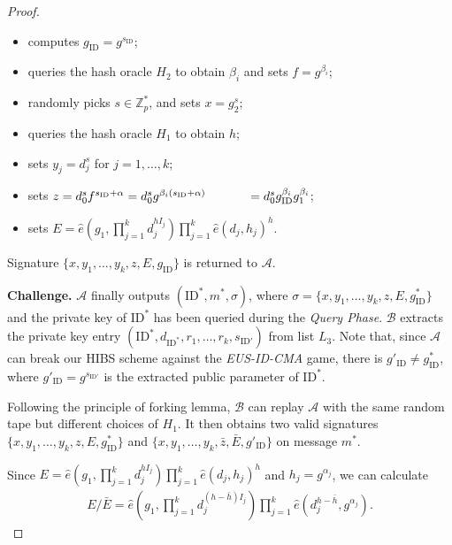 \documentclass[times]{secauth}
\theoremstyle{definition}
\theoremstyle{remark}
\begin{document}
\begin{proof}
\begin{itemize}
	\begin{itemize}
		\item computes $g_\mathrm{ID} = g^{s_\mathrm{ID}}$;
		\item queries the hash oracle $H_2$ to obtain $\beta_i$ and sets $f = g^{\beta_i}$;
		\item randomly picks $s \in \mathbb{Z}_p^*$, and sets $x = g_2^s$;
		\item queries the hash oracle $H_1$ to obtain $h$;
		\item sets $y_j = d_j^s$ for $j = 1,\ldots, k$;
		\item sets $z= d_0^{s} f^{s_\mathrm{ID}+\alpha} = d_0^{s}g^{\beta_i(s_\mathrm{ID}+\alpha)} \\
		~~~~~~~~~~= d_0^{s}g_\mathrm{ID}^{\beta_i}g_1^{\beta_i}$;
		\item sets $E= \hat{e}(g_1, \prod_{j=1}^{k} d_j^{hI_j})\prod_{j=1}^{k} \hat{e}(d_j, h_j)^h$.	
	\end{itemize}
	Signature $\{x, y_1, \ldots, y_k, z, E, g_{\mathrm{ID}}\}$ is returned to $\mathcal{A}$.
\end{itemize}
\textbf{Challenge.} 
$\mathcal{A}$ finally outputs $(\mathrm{ID}^*, m^*, \sigma)$, where $ \sigma=\{x, y_1, \ldots, y_k, z, E, g^*_\mathrm{ID}\}$ and the private key of $\mathrm{ID}^*$ has been queried during the \emph{Query Phase}. 
$\mathcal{B}$ extracts the private key entry $(\mathrm{ID}^*, d_{\mathrm{ID}^*}, r_1, \ldots, r_k, s_{\mathrm{ID}'})$ from list $L_3$. 
Note that, since $\mathcal{A}$ can break our HIBS scheme against the \emph{EUS-ID-CMA} game, there is $g'_\mathrm{ID} \neq g^*_\mathrm{ID}$, where $g'_\mathrm{ID} = g^{s_{\mathrm{ID}'}}$ is the extracted public parameter of $\mathrm{ID}^*$.
\par
Following the principle of forking lemma, $\mathcal{B}$ can replay $\mathcal{A}$ with the same random tape but different choices of $H_1$.
It then obtains two valid signatures $\{x, y_1, \ldots, y_k, z, E, g^*_\mathrm{ID}\}$ and $\{x, y_1, \ldots, y_k, \bar{z}, \bar{E}, g'_\mathrm{ID}\}$ on message $m^*$. 
\par
Since $E= \hat{e}(g_1, \prod_{j=1}^{k} d_j^{hI_j})\prod_{j=1}^{k} \hat{e}(d_j, h_j)^h$ and $h_j = g^{\alpha_j}$, we can calculate
\begin{align*}
E/\bar{E} = \hat{e}(g_1, \prod_{j=1}^k d_j^{(h-\bar{h})I_j})\prod_{j=1}^k \hat{e}(d_j^{h-\bar{h}}, g^{\alpha_j}).
\end{align*}


\end{proof}
\end{document}

